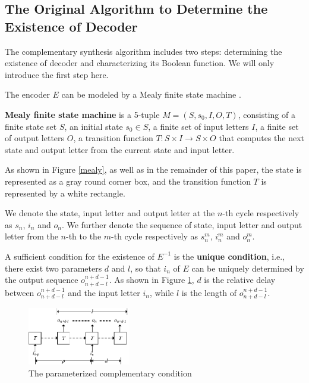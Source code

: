 \documentclass[journal]{IEEEtran}
\begin{document}
\subsection{The Original Algorithm to Determine the Existence of Decoder}\label{subsec_chkextdec}
The complementary synthesis algorithm\cite{ShengYuShen:iccad09} includes two steps:
determining the existence of decoder and characterizing its Boolean function.
We will only introduce the first step here.

The encoder $E$ can be modeled by a Mealy finite state machine \cite{MEALY}.

\begin{definition11}\label{MealyFSM}%
\textbf{Mealy finite state machine} is a 5-tuple $M=(S,s_0,I,O,T)$,
consisting of a finite state set $S$,
an initial state $s_0\in S$,
a finite set of input letters $I$,
a finite set of output letters $O$,
a transition function $T: S\times I\to S\times O$ that computes the next state and output letter from the current state and input letter.
\end{definition11}

As shown in Figure \ref{mealy},
as well as in the remainder of this paper,
the state is represented as a gray round corner box,
and the transition function $T$ is represented by a white rectangle.

We denote the state, input letter and output letter at the $n$-th cycle respectively as $s_n$, $i_n$ and $o_n$.
We further denote the sequence of state, input letter and output letter from the $n$-th to the $m$-th cycle respectively as $s_n^m$, $i_n^m$ and $o_n^m$.

A sufficient condition for the existence of $E^{-1}$ is the \textbf{unique condition},
i.e.,
there exist two parameters $d$ and $l$,
so that $i_n$ of $E$ can be uniquely determined by the output sequence $o_{n+d-l}^{n+d-1}$.
As shown in Figure \ref{t1},
$d$ is the relative delay between $o_{n+d-l}^{n+d-1}$ and the input letter $i_n$,
while $l$ is the length of $o_{n+d-l}^{n+d-1}$.

\begin{figure}[b]
\begin{center}
\includegraphics[width=0.4\textwidth]{t1}
\end{center}
\caption{The parameterized complementary condition}
  \label{t1}
\end{figure}
\end{document}

